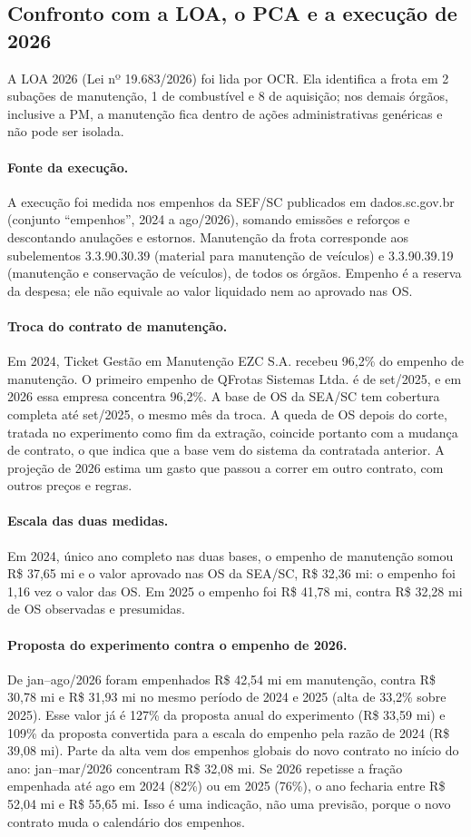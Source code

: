 \subsection{Confronto com a LOA, o PCA e a execução de 2026}
A LOA 2026 (Lei nº 19.683/2026) foi lida por OCR. Ela identifica a frota em 2 subações de manutenção, 1 de combustível e 8 de aquisição; nos demais órgãos, inclusive a PM, a manutenção fica dentro de ações administrativas genéricas e não pode ser isolada.
\paragraph{Fonte da execução.} A execução foi medida nos empenhos da SEF/SC publicados em dados.sc.gov.br (conjunto ``empenhos'', 2024 a ago/2026), somando emissões e reforços e descontando anulações e estornos. Manutenção da frota corresponde aos subelementos 3.3.90.30.39 (material para manutenção de veículos) e 3.3.90.39.19 (manutenção e conservação de veículos), de todos os órgãos. Empenho é a reserva da despesa; ele não equivale ao valor liquidado nem ao aprovado nas OS.

\paragraph{Troca do contrato de manutenção.} Em 2024, Ticket Gestão em Manutenção EZC S.A. recebeu 96,2\% do empenho de manutenção. O primeiro empenho de QFrotas Sistemas Ltda. é de set/2025, e em 2026 essa empresa concentra 96,2\%. A base de OS da SEA/SC tem cobertura completa até set/2025, o mesmo mês da troca. A queda de OS depois do corte, tratada no experimento como fim da extração, coincide portanto com a mudança de contrato, o que indica que a base vem do sistema da contratada anterior. A projeção de 2026 estima um gasto que passou a correr em outro contrato, com outros preços e regras.

\paragraph{Escala das duas medidas.} Em 2024, único ano completo nas duas bases, o empenho de manutenção somou R\$ 37,65 mi e o valor aprovado nas OS da SEA/SC, R\$ 32,36 mi: o empenho foi 1,16 vez o valor das OS. Em 2025 o empenho foi R\$ 41,78 mi, contra R\$ 32,28 mi de OS observadas e presumidas.

\paragraph{Proposta do experimento contra o empenho de 2026.} De jan--ago/2026 foram empenhados R\$ 42,54 mi em manutenção, contra R\$ 30,78 mi e R\$ 31,93 mi no mesmo período de 2024 e 2025 (alta de 33,2\% sobre 2025). Esse valor já é 127\% da proposta anual do experimento (R\$ 33,59 mi) e 109\% da proposta convertida para a escala do empenho pela razão de 2024 (R\$ 39,08 mi). Parte da alta vem dos empenhos globais do novo contrato no início do ano: jan--mar/2026 concentram R\$ 32,08 mi. Se 2026 repetisse a fração empenhada até ago em 2024 (82\%) ou em 2025 (76\%), o ano fecharia entre R\$ 52,04 mi e R\$ 55,65 mi. Isso é uma indicação, não uma previsão, porque o novo contrato muda o calendário dos empenhos.

